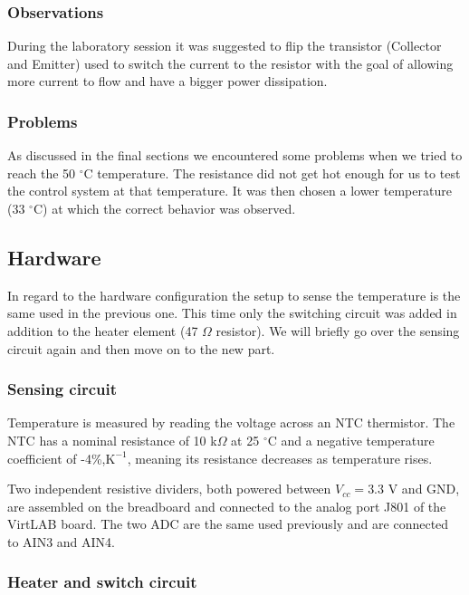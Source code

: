\documentclass[../main.tex]{subfiles}
\begin{document}
\subsubsection*{Observations}

During the laboratory session it was suggested to flip the transistor (Collector and Emitter) used to switch the current to the resistor with the goal of allowing more current to flow and have a bigger power dissipation.

\subsubsection*{Problems}

As discussed in the final sections we encountered some problems when we tried to reach the 50 $^\circ$C temperature. The resistance did not get hot enough for us to test the control system at that temperature. It was then chosen a lower temperature (33 $^\circ$C) at which the correct behavior was observed. 


\subsection{Hardware}


In regard to the hardware configuration the setup to sense the temperature is the same used in the previous one. This time only the switching circuit was added in addition to the heater element (47 $\Omega$ resistor).
We will briefly go over the sensing circuit again and then move on to the new part.

\subsubsection*{Sensing circuit}

Temperature is measured by reading the voltage across an NTC thermistor. The NTC has a nominal resistance of 10 k$\Omega$ at 25 $^\circ$C and a negative temperature coefficient of -4\%,$\text{K}^{-1}$, meaning its resistance decreases as temperature rises.

Two independent resistive dividers, both powered between $V_{cc} = 3.3$ V and GND, are assembled on the breadboard and connected to the analog port J801 of the VirtLAB board.
The two ADC are the same used previously and are connected to AIN3 and AIN4.

\subsubsection*{Heater and switch circuit}
\end{document}
